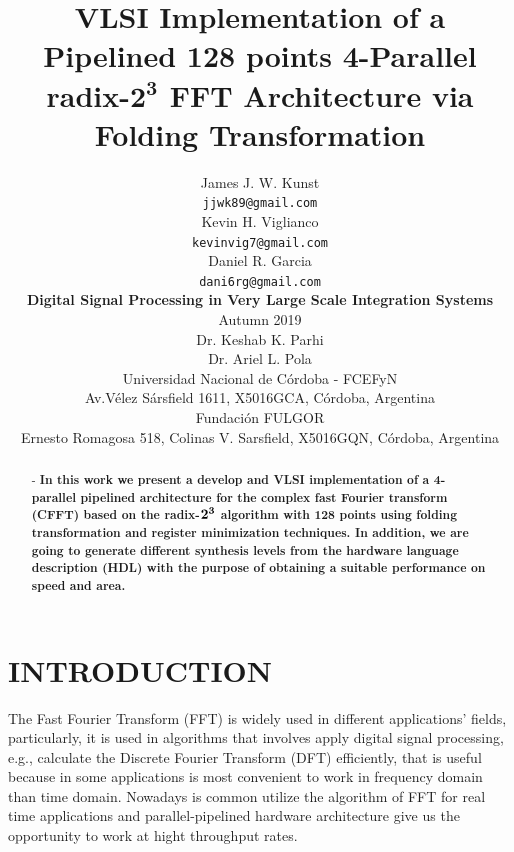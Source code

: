 \documentclass[journal,comsoc]{IEEEtran}
\begin{document}
\title{
\huge \bf VLSI Implementation of a Pipelined 128 points 4-Parallel radix-$\mathbf{2^3}$ FFT Architecture via Folding Transformation
}
\author{
James J. W. Kunst   \\{\tt\small jjwk89@gmail.com}		\\
Kevin H. Viglianco	\\{\tt\small kevinvig7@gmail.com}	\\ 
Daniel R. Garcia	\\{\tt\small dani6rg@gmail.com}		\\
[0.5cm]
{\large \bf Digital Signal Processing in Very Large Scale Integration Systems}\\
[0.5cm]
Autumn 2019\\
[0.5cm]
Dr. Keshab K. Parhi	\\
Dr. Ariel L. Pola	\\
[0.5cm]
Universidad Nacional de Córdoba - FCEFyN\\
Av.Vélez Sársfield 1611, X5016GCA, C\'ordoba, Argentina\\
[0.5cm]
Fundación FULGOR\\
Ernesto Romagosa 518, Colinas V. Sarsfield, X5016GQN, Córdoba, Argentina         
}
\maketitle


\begin{abstract} - \bf In this work we present a develop and VLSI implementation of a 4-parallel pipelined architecture for the complex fast Fourier transform (CFFT) based on the radix-$\bf 2^3$ algorithm with 128 points using folding transformation and register minimization techniques. In addition, we are going to generate different synthesis levels from the hardware language description (HDL) with the purpose of obtaining a suitable performance on speed and area. %
\end{abstract}
\section{INTRODUCTION}
The Fast Fourier Transform (FFT) is widely used in different applications' fields, particularly, it is used in algorithms that involves apply digital signal processing, e.g., calculate the Discrete Fourier Transform (DFT) efficiently, that is useful because in some applications is most convenient to work in frequency domain than time domain. Nowadays is common utilize the algorithm of FFT for real time applications and parallel-pipelined hardware architecture give us the opportunity to work at hight throughput rates.
\end{document}
